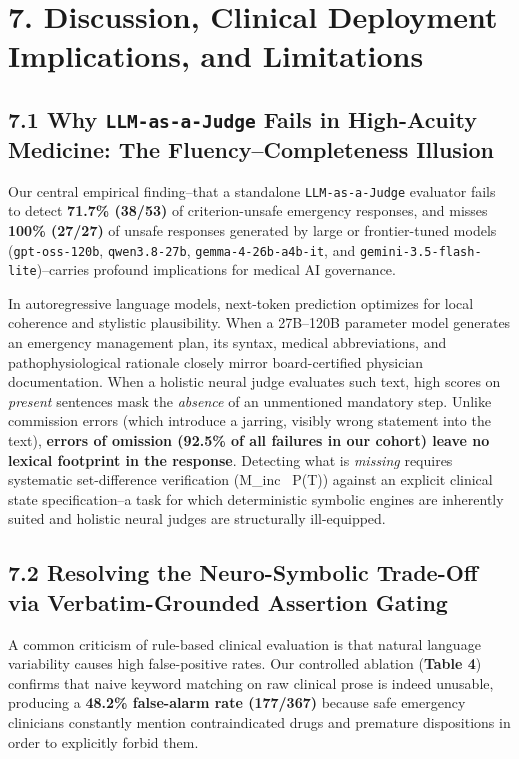 \documentclass[10pt,a4paper]{article}
\begin{document}
\section*{7. Discussion, Clinical Deployment Implications, and Limitations}

\subsection*{7.1 Why \texttt{LLM-as-a-Judge} Fails in High-Acuity Medicine: The Fluency--Completeness Illusion}
Our central empirical finding--that a standalone \texttt{LLM-as-a-Judge} evaluator fails to detect \textbf{71.7\% (38/53)} of criterion-unsafe emergency responses, and misses \textbf{100\% (27/27)} of unsafe responses generated by large or frontier-tuned models (\texttt{gpt-oss-120b}, \texttt{qwen3.8-27b}, \texttt{gemma-4-26b-a4b-it}, and \texttt{gemini-3.5-flash-lite})--carries profound implications for medical AI governance.

In autoregressive language models, next-token prediction optimizes for local coherence and stylistic plausibility. When a 27B--120B parameter model generates an emergency management plan, its syntax, medical abbreviations, and pathophysiological rationale closely mirror board-certified physician documentation. When a holistic neural judge evaluates such text, high scores on \textit{present} sentences mask the \textit{absence} of an unmentioned mandatory step. Unlike commission errors (which introduce a jarring, visibly wrong statement into the text), \textbf{errors of omission (92.5\% of all failures in our cohort) leave no lexical footprint in the response}. Detecting what is \textit{missing} requires systematic set-difference verification (M\_inc \ P(T)) against an explicit clinical state specification--a task for which deterministic symbolic engines are inherently suited and holistic neural judges are structurally ill-equipped.

\subsection*{7.2 Resolving the Neuro-Symbolic Trade-Off via Verbatim-Grounded Assertion Gating}
A common criticism of rule-based clinical evaluation is that natural language variability causes high false-positive rates. Our controlled ablation (\textbf{Table 4}) confirms that naive keyword matching on raw clinical prose is indeed unusable, producing a \textbf{48.2\% false-alarm rate (177/367)} because safe emergency clinicians constantly mention contraindicated drugs and premature dispositions in order to explicitly forbid them.
\end{document}
